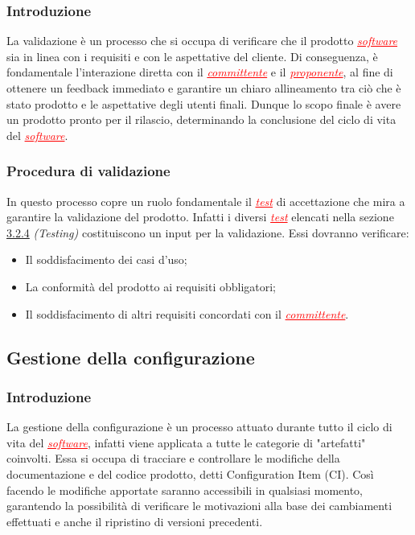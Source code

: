 \subsubsection{Introduzione}
La validazione è un processo che si occupa di verificare che il prodotto \textcolor{red}{\uline{\textit{software}}} sia in linea con i requisiti
e con le aspettative del cliente. Di conseguenza, è fondamentale l'interazione diretta con il \textcolor{red}{\uline{\textit{committente}}} e il
\textcolor{red}{\uline{\textit{proponente}}}, al fine di ottenere un feedback immediato e garantire un chiaro allineamento tra ciò che è stato
prodotto e le aspettative degli utenti finali. Dunque lo scopo finale è avere un prodotto pronto per il rilascio, determinando la 
conclusione del ciclo di vita del \textcolor{red}{\uline{\textit{software}}}.

\subsubsection{Procedura di validazione}
In questo processo copre un ruolo fondamentale il \textcolor{red}{\uline{\textit{test}}} di accettazione che mira a garantire la validazione
del prodotto. Infatti i diversi \textcolor{red}{\uline{\textit{test}}} elencati nella sezione \href{#testing}{3.2.4} \textit{(Testing)} costituiscono un input
per la validazione. Essi dovranno verificare:
\begin{itemize}
    \item Il soddisfacimento dei casi d'uso;
    \item La conformità del prodotto ai requisiti obbligatori;
    \item Il soddisfacimento di altri requisiti concordati con il \textcolor{red}{\uline{\textit{committente}}}.
\end{itemize}

\subsection{Gestione della configurazione}
\subsubsection{Introduzione}
La gestione della configurazione è un processo attuato durante tutto il ciclo di vita del \textcolor{red}{\uline{\textit{software}}}, infatti viene
applicata a tutte le categorie di "artefatti" coinvolti. Essa si occupa di tracciare e controllare le modifiche della documentazione e del codice
prodotto, detti Configuration Item (CI). Così facendo le modifiche apportate saranno accessibili in qualsiasi momento, garantendo la
possibilità di verificare le motivazioni alla base dei cambiamenti effettuati e anche il ripristino di versioni precedenti.

